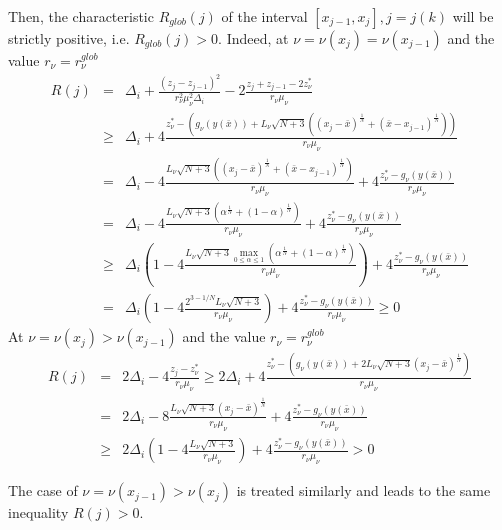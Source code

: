 \documentclass[review]{elsarticle}
\begin{document}
	Then, the characteristic $R_{glob}(j)$ of the interval $[x_{j-1}, x_j], j=j(k)$ will be strictly positive, i.e. $R_{glob}(j)>0$. Indeed, at $\nu=\nu(x_j)=\nu(x_{j-1})$ and the value $r_{\nu}=r_{\nu}^{glob}$
\begin{eqnarray}
	R(j) &=& \Delta_i + \frac{(z_j-z_{j-1})^2}{r_{\nu}^2\mu_{\nu}^2\Delta_i} - 2\frac{z_j+z_{j-1}-2z_{\nu}^*}{r_{\nu}\mu_{\nu}}  \nonumber \\
	&\geq& \Delta_i + 4\frac{z_{\nu}^*-\left( g_{\nu}\left( y(\bar x) \right)+L_{\nu}\sqrt{N+3}\left( (x_j-\bar x)^{\frac{1}{N}}+(\bar x - x_{j-1})^{\frac{1}{N}} \right)\right)}{r_{\nu}\mu_{\nu}} \nonumber \\
	&=& \Delta_i-4\frac{L_{\nu}\sqrt{N+3}\left( (x_j-\bar x)^{\frac{1}{N}}+(\bar x - x_{j-1})^{\frac{1}{N}} \right)}{r_{\nu}\mu_{\nu}}+4\frac{z_{\nu}^*-g_{\nu}\left( y(\bar x) \right)}{r_{\nu}\mu_{\nu}} \nonumber \\
	&=& \Delta_i-4\frac{L_{\nu}\sqrt{N+3}\left( \alpha^{\frac{1}{N}}+(1-\alpha)^{\frac{1}{N}} \right)}{r_{\nu}\mu_{\nu}}+4\frac{z_{\nu}^*-g_{\nu}\left( y(\bar x) \right)}{r_{\nu}\mu_{\nu}} \nonumber \\
	&\geq& \Delta_i\left(1-4\frac{L_{\nu}\sqrt{N+3}\max_{0\leq\alpha\leq1} {\left( \alpha^{\frac{1}{N}}+(1-\alpha)^{\frac{1}{N}} \right)}}{r_{\nu}\mu_{\nu}} \right)+4\frac{z_{\nu}^*-g_{\nu}\left( y(\bar x) \right)}{r_{\nu}\mu_{\nu}} \nonumber \\
	&=& \Delta_i\left(1-4\frac{2^{3-1/N}L_{\nu}\sqrt{N+3}}{r_{\nu}\mu_{\nu}} \right)+4\frac{z_{\nu}^*-g_{\nu}\left( y(\bar x) \right)}{r_{\nu}\mu_{\nu}} \geq 0
	\nonumber
\end{eqnarray}
At $\nu=\nu(x_j ) > \nu(x_{j-1})$ and the value $r_{\nu}=r_{\nu}^{glob}$
\begin{eqnarray}
	R(j) &=& 2\Delta_i - 4\frac{z_j-z_{\nu}^*}{r_{\nu}\mu_{\nu}} \geq 2\Delta_i+4\frac{z_{\nu}^*-\left( g_{\nu}\left(y(\bar x)\right)+2L_{\nu}\sqrt{N+3}(x_j-\bar x)^{\frac{1}{N}} \right)}{r_{\nu}\mu_{\nu}} \nonumber \\
	&=& 2\Delta_i - 8\frac{L_{\nu}\sqrt{N+3}(x_j-\bar x)^{\frac{1}{N}}}{r_{\nu}\mu_{\nu}}+4\frac{z_{\nu}^*-g_{\nu}\left( y(\bar x) \right)}{r_{\nu}\mu_{\nu}} \nonumber \\
	&\geq& 2\Delta_i\left( 1-4\frac{L_{\nu}\sqrt{N+3}}{r_{\nu}\mu_{\nu}} \right) + 4\frac{z_{\nu}^*-g_{\nu}\left( y(\bar x) \right)}{r_{\nu}\mu_{\nu}} > 0
	\nonumber
\end{eqnarray}

	The case of $\nu=\nu(x_{j-1})>\nu(x_j)$ is treated similarly and leads to the same inequality $R(j)>0$.
\end{document}
